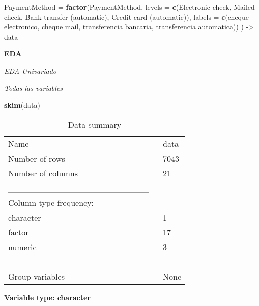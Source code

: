 \documentclass[
]{article}
\newenvironment{Shaded}{\begin{snugshade}}{\end{snugshade}}
\newcommand{\AttributeTok}[1]{\textcolor[rgb]{0.13,0.29,0.53}{#1}}
\newcommand{\FunctionTok}[1]{\textcolor[rgb]{0.13,0.29,0.53}{\textbf{#1}}}
\newcommand{\NormalTok}[1]{#1}
\newcommand{\OtherTok}[1]{\textcolor[rgb]{0.56,0.35,0.01}{#1}}
\newcommand{\StringTok}[1]{\textcolor[rgb]{0.31,0.60,0.02}{#1}}
\begin{document}
\begin{Shaded}
\begin{Highlighting}[]
    \AttributeTok{PaymentMethod =} \FunctionTok{factor}\NormalTok{(PaymentMethod, }\AttributeTok{levels =} \FunctionTok{c}\NormalTok{(}\StringTok{\textquotesingle{}Electronic check\textquotesingle{}}\NormalTok{, }\StringTok{\textquotesingle{}Mailed check\textquotesingle{}}\NormalTok{, }\StringTok{\textquotesingle{}Bank transfer (automatic)\textquotesingle{}}\NormalTok{, }\StringTok{\textquotesingle{}Credit card (automatic)\textquotesingle{}}\NormalTok{), }\AttributeTok{labels =} \FunctionTok{c}\NormalTok{(}\StringTok{\textquotesingle{}cheque electronico\textquotesingle{}}\NormalTok{, }\StringTok{\textquotesingle{}cheque mail\textquotesingle{}}\NormalTok{, }\StringTok{\textquotesingle{}transferencia bancaria\textquotesingle{}}\NormalTok{, }\StringTok{\textquotesingle{}transferencia automatica\textquotesingle{}}\NormalTok{))}
\NormalTok{  ) }\OtherTok{{-}\textgreater{}}\NormalTok{ data}
\end{Highlighting}
\end{Shaded}

\textbf{EDA}

\emph{EDA Univariado}

\emph{Todas las variables}

\begin{Shaded}
\begin{Highlighting}[]
\FunctionTok{skim}\NormalTok{(data)}
\end{Highlighting}
\end{Shaded}

\begin{longtable}[]{@{}ll@{}}
\caption{Data summary}\tabularnewline
\toprule\noalign{}
\endfirsthead
\endhead
\bottomrule\noalign{}
\endlastfoot
Name & data \\
Number of rows & 7043 \\
Number of columns & 21 \\
\_\_\_\_\_\_\_\_\_\_\_\_\_\_\_\_\_\_\_\_\_\_\_ & \\
Column type frequency: & \\
character & 1 \\
factor & 17 \\
numeric & 3 \\
\_\_\_\_\_\_\_\_\_\_\_\_\_\_\_\_\_\_\_\_\_\_\_\_ & \\
Group variables & None \\
\end{longtable}

\textbf{Variable type: character}
\end{document}
